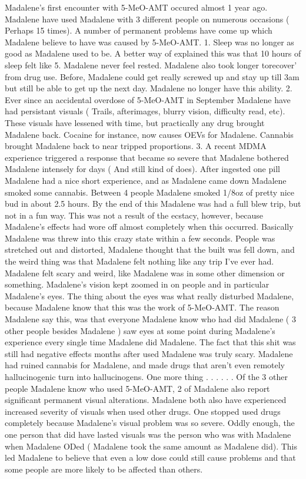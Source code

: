 \documentclass[12pt]{book}
\begin{document}
Madalene's first encounter with 5-MeO-AMT occured almost 1 year ago. Madalene have used Madalene with 3 different people on numerous occasions ( Perhaps 15 times). A number of permanent problems have come up which Madalene believe to have was caused by 5-MeO-AMT. 1. Sleep was no longer as good as Madalene used to be. A better way of explained this was that 10 hours of sleep felt like 5. Madalene never feel rested. Madalene also took longer torecover' from drug use. Before, Madalene could get really screwed up and stay up till 3am but still be able to get up the next day. Madalene no longer have this ability. 2. Ever since an accidental overdose of 5-MeO-AMT in September Madalene have had persistant visuals ( Trails, afterimages, blurry vision, difficulty read, etc). These visuals have lessened with time, but practically any drug brought Madalene back. Cocaine for instance, now causes OEVs for Madalene. Cannabis brought Madalene back to near tripped proportions. 3. A recent MDMA experience triggered a response that became so severe that Madalene bothered Madalene intensely for days ( And still kind of does). After ingested one pill Madalene had a nice short experience, and as Madalene came down Madalene smoked some cannabis. Between 4 people Madalene smoked 1/8oz of pretty nice bud in about 2.5 hours. By the end of this Madalene was had a full blew trip, but not in a fun way. This was not a result of the ecstacy, however, because Madalene's effects had wore off almost completely when this occurred. Basically Madalene was threw into this crazy state within a few seconds. People was stretched out and distorted, Madalene thought that the built was fell down, and the weird thing was that Madalene felt nothing like any trip I've ever had. Madalene felt scary and weird, like Madalene was in some other dimension or something. Madalene's vision kept zoomed in on people and in particular Madalene's eyes. The thing about the eyes was what really disturbed Madalene, because Madalene know that this was the work of 5-MeO-AMT. The reason Madalene say this, was that everyone Madalene know who had did Madalene ( 3 other people besides Madalene ) saw eyes at some point during Madalene's experience every single time Madalene did Madalene. The fact that this shit was still had negative effects months after used Madalene was truly scary. Madalene had ruined cannabis for Madalene, and made drugs that aren't even remotely hallucinogenic turn into hallucinogens. One more thing . . .   . . .  Of the 3 other people Madalene know who used 5-MeO-AMT, 2 of Madalene also report significant permanent visual alterations. Madalene both also have experienced increased severity of visuals when used other drugs. One stopped used drugs completely because Madalene's visual problem was so severe. Oddly enough, the one person that did have lasted visuals was the person who was with Madalene when Madalene ODed ( Madalene took the same amount as Madalene did). This led Madalene to believe that even a low dose could still cause problems and that some people are more likely to be affected than others.
\end{document}
